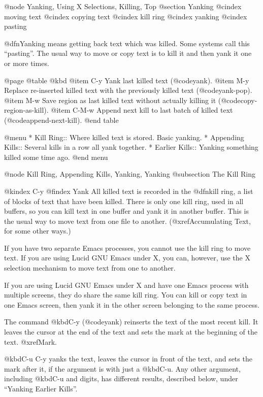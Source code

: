 {{{{@node Yanking, Using X Selections, Killing, Top
@section Yanking
@cindex moving text
@cindex copying text
@cindex kill ring
@cindex yanking
@cindex pasting

  @dfn{Yanking} means getting back text which was killed. Some systems
call this ``pasting''.  The usual way to move or copy text is to kill it
and then yank it one or more times.

@page
@table @kbd
@item C-y
Yank last killed text (@code{yank}).
@item M-y
Replace re-inserted killed text with the previously killed text
(@code{yank-pop}).
@item M-w
Save region as last killed text without actually killing it
(@code{copy-region-as-kill}).
@item C-M-w
Append next kill to last batch of killed text (@code{append-next-kill}).
@end table

@menu
* Kill Ring::       Where killed text is stored.  Basic yanking.
* Appending Kills:: Several kills in a row all yank together.
* Earlier Kills::   Yanking something killed some time ago.
@end menu

@node Kill Ring, Appending Kills, Yanking, Yanking
@subsection The Kill Ring

@kindex C-y
@findex Yank
  All killed text is recorded in the @dfn{kill ring}, a list of blocks of
text that have been killed.  There is only one kill ring, used in all
buffers, so you can kill text in one buffer and yank it in another buffer.
This is the usual way to move text from one file to another.
(@xref{Accumulating Text}, for some other ways.)

  If you have two separate Emacs processes, you cannot use the kill ring
to move text. If you are using Lucid GNU Emacs under X, you can,
however, use the X selection mechanism to move text from one to another.

If you are using Lucid GNU Emacs under X and have one Emacs process with
multiple screens, they do share the same kill ring.  You can kill or
copy text in one Emacs screen, then yank it in the other screen
belonging to the same process.

  The command @kbd{C-y} (@code{yank}) reinserts the text of the most recent
kill.  It leaves the cursor at the end of the text and sets the mark at
the beginning of the text.  @xref{Mark}.

  @kbd{C-u C-y} yanks the text, leaves the cursor in front of the text,
and sets the mark after it, if the argument is with just a @kbd{C-u}.
Any other argument, including @kbd{C-u} and digits, has different
results, described below, under ``Yanking Earlier Kills''.

}}}}
